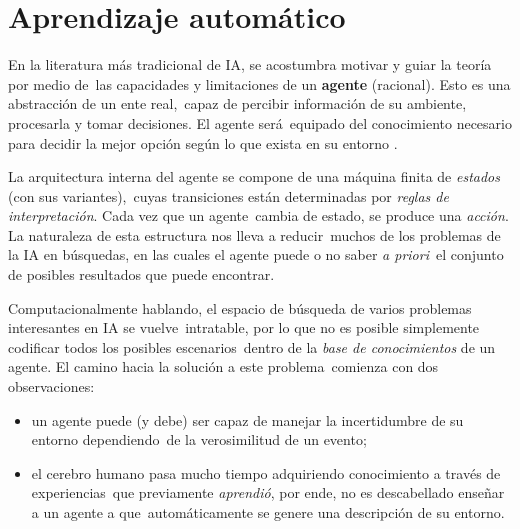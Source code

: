\section{Aprendizaje automático}

\noindent
En la literatura más tradicional de IA, se acostumbra motivar y guiar la teoría por medio de\
las capacidades y limitaciones de un \textbf{agente} (racional). Esto es una abstracción de un ente real,\
capaz de percibir información de su ambiente, procesarla y tomar decisiones. El agente será\
equipado del conocimiento necesario para decidir la mejor opción según lo que exista en su entorno \cite{russell2010}.\par
La arquitectura interna del agente se compone de una máquina finita de \emph{estados} (con sus variantes),\
cuyas transiciones están determinadas por \emph{reglas de interpretación}. Cada vez que un agente\
cambia de estado, se produce una \emph{acción}. La naturaleza de esta estructura nos lleva a reducir\
muchos de los problemas de la IA en búsquedas, en las cuales el agente puede o no saber \emph{a priori}\
el conjunto de posibles resultados que puede encontrar.\par
Computacionalmente hablando, el espacio de búsqueda de varios problemas interesantes en IA se vuelve\
intratable, por lo que no es posible simplemente codificar todos los posibles escenarios\
dentro de la \emph{base de conocimientos} de un agente. El camino hacia la solución a este problema\
comienza con dos observaciones:
\begin{itemize}
\item un agente puede (y debe) ser capaz de manejar la incertidumbre de su entorno dependiendo\
  de la verosimilitud de un evento;
\item el cerebro humano pasa mucho tiempo adquiriendo conocimiento a través de experiencias\
  que previamente \emph{aprendió}, por ende, no es descabellado enseñar a un agente a que\
  automáticamente se genere una descripción de su entorno.
\end{itemize}


